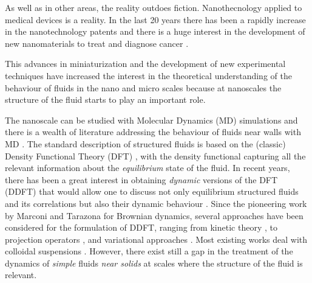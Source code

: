 \documentclass[b5paper,openright,10pt]{book}
\begin{document}
As well as in other areas, the reality outdoes fiction. 
Nanothecnology applied to medical devices is a reality. In the last 20 years there has been a rapidly increase in the nanotechnology patents \cite{Zheng2014} and there is a huge interest in the development of new nanomaterials to treat and diagnose cancer \cite{Nazir2014, Dreaden2012, Kievit2011}. 

This   advances  in   miniaturization  and   the  development   of  new
experimental techniques have  increased the
interest in the  theoretical understanding of the  behaviour of fluids in the nano \cite{Bocquet2010,KarniadakisBook2005} and micro \cite{Lauga2005, Bocquet2011,KarniadakisBook2005} scales because at nanoscales  the structure  of the  fluid starts to play an  important
role.   

The
nanoscale can be studied with Molecular Dynamics (MD) simulations and there
is  a wealth  of literature  addressing the  behaviour of  fluids near
walls  with  MD \cite{Koplik1995,Wang2017}.   
The standard  description of structured fluids is  based on the
(classic) Density Functional Theory (DFT) \cite{Evans1979}, with the density
functional   capturing  all   the  relevant   information  about   the
\textit{equilibrium} state  of the fluid.   In recent years,  there has
been a  great interest in  obtaining \textit{dynamic} versions  of the
DFT (DDFT) that would allow one  to discuss not
only equilibrium structured fluids and its correlations but also their
dynamic  behaviour \cite{Lowen2003,Evans2016}.   Since the  pioneering
work by Marconi and Tarazona  \cite{Marconi2000} for Brownian dynamics, several approaches
have been considered  for the formulation of DDFT,
ranging from  kinetic theory  \cite{Guo2006}, to  projection operators
\cite{Espanol2009a},  and variational  approaches \cite{Schmidt2013}.
Most    existing    works     deal    with    colloidal    suspensions
\cite{Goddard2012,Evans2016}. However, there exist  still a gap in the
treatment  of the dynamics of \textit{simple}  fluids \textit{near  solids} at  scales
where  the  structure  of  the  fluid  is  relevant.   
\end{document}
